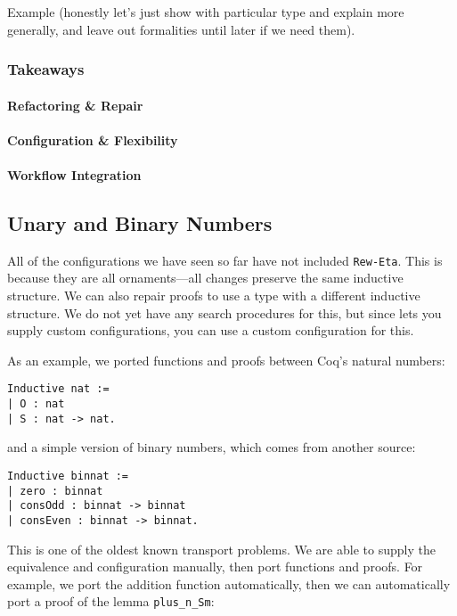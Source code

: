 Example (honestly let's just show with particular type and explain more generally, and leave out formalities until later if we need them).

\subsubsection{Takeaways}

\paragraph{Refactoring \& Repair}

\paragraph{Configuration \& Flexibility}

\paragraph{Workflow Integration}

\subsection{Unary and Binary Numbers}
\label{sec:bin}

All of the configurations we have seen so far have not included \lstinline{Rew-Eta}.
This is because they are all ornaments---all changes preserve the same inductive structure.
We can also repair proofs to use a type with a different inductive structure.
We do not yet have any search procedures for this, but since \toolname lets you supply
custom configurations, you can use a custom configuration for this.

As an example, we ported functions and proofs between Coq's natural numbers:

\begin{lstlisting}
Inductive nat :=
| O : nat
| S : nat -> nat.
\end{lstlisting}
and a simple version of binary numbers, which comes from another source:

\begin{lstlisting}
Inductive binnat :=
| zero : binnat
| consOdd : binnat -> binnat
| consEven : binnat -> binnat.
\end{lstlisting}
This is one of the oldest known transport problems.
We are able to supply the equivalence and configuration manually,
then port functions and proofs.
For example, we port the addition function automatically,
then we can automatically port a proof of the lemma \lstinline{plus_n_Sm}:

